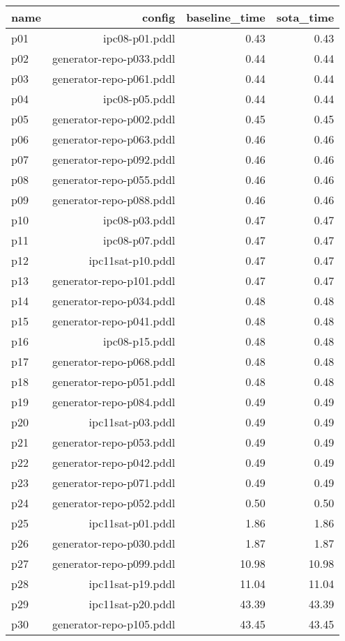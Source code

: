 \documentclass{article}
\begin{document}
                            \begin{center}
                            \scriptsize
                            \begin{tabular}{@{}l|r|r|r@{}}
                            name & config & baseline\_time & sota\_time\\\midrule
                              p01& ipc08-p01.pddl&0.43&0.43\\
  p02& generator-repo-p033.pddl&0.44&0.44\\
  p03& generator-repo-p061.pddl&0.44&0.44\\
  p04& ipc08-p05.pddl&0.44&0.44\\
  p05& generator-repo-p002.pddl&0.45&0.45\\
  p06& generator-repo-p063.pddl&0.46&0.46\\
  p07& generator-repo-p092.pddl&0.46&0.46\\
  p08& generator-repo-p055.pddl&0.46&0.46\\
  p09& generator-repo-p088.pddl&0.46&0.46\\
  p10& ipc08-p03.pddl&0.47&0.47\\
  p11& ipc08-p07.pddl&0.47&0.47\\
  p12& ipc11sat-p10.pddl&0.47&0.47\\
  p13& generator-repo-p101.pddl&0.47&0.47\\
  p14& generator-repo-p034.pddl&0.48&0.48\\
  p15& generator-repo-p041.pddl&0.48&0.48\\
  p16& ipc08-p15.pddl&0.48&0.48\\
  p17& generator-repo-p068.pddl&0.48&0.48\\
  p18& generator-repo-p051.pddl&0.48&0.48\\
  p19& generator-repo-p084.pddl&0.49&0.49\\
  p20& ipc11sat-p03.pddl&0.49&0.49\\
  p21& generator-repo-p053.pddl&0.49&0.49\\
  p22& generator-repo-p042.pddl&0.49&0.49\\
  p23& generator-repo-p071.pddl&0.49&0.49\\
  p24& generator-repo-p052.pddl&0.50&0.50\\
  p25& ipc11sat-p01.pddl&1.86&1.86\\
  p26& generator-repo-p030.pddl&1.87&1.87\\
  p27& generator-repo-p099.pddl&10.98&10.98\\
  p28& ipc11sat-p19.pddl&11.04&11.04\\
  p29& ipc11sat-p20.pddl&43.39&43.39\\
  p30& generator-repo-p105.pddl&43.45&43.45
                            \end{tabular}
                            \end{center}
                    
\end{document}
